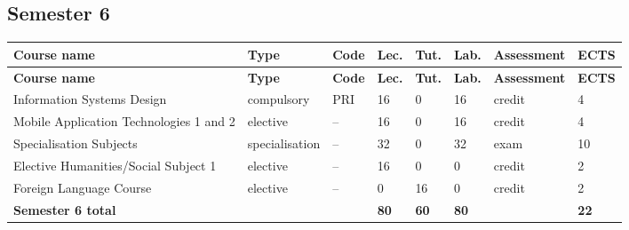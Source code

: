 \documentclass[12pt,a4paper]{article}
\newcommand{\thdrule}{\noalign{\global\setlength{\extrarowheight}{0pt}}}
\newcommand{\thdend}{\noalign{\global\setlength{\extrarowheight}{4pt}}}
\begin{document}
\subsection*{Semester 6}

{\scriptsize
\begin{longtable}{m{5.0cm}m{1.9cm}m{0.75cm}m{0.85cm}m{0.85cm}m{0.85cm}m{1.45cm}m{0.9cm}}
\thdrule\toprule
\rowcolor{pjatkRed}
{\color{white}\footnotesize\textbf{\vphantom{Ag}Course name}} & {\color{white}\footnotesize\textbf{\vphantom{Ag}Type}} & {\color{white}\footnotesize\textbf{\vphantom{Ag}Code}} & {\color{white}\footnotesize\textbf{\vphantom{Ag}Lec.}} & {\color{white}\footnotesize\textbf{\vphantom{Ag}Tut.}} & {\color{white}\footnotesize\textbf{\vphantom{Ag}Lab.}} & {\color{white}\footnotesize\textbf{\vphantom{Ag}Assessment}} & {\color{white}\footnotesize\textbf{\vphantom{Ag}ECTS}} \\
\midrule\thdend
\endfirsthead
\thdrule\toprule
\rowcolor{pjatkRed}
{\color{white}\footnotesize\textbf{\vphantom{Ag}Course name}} & {\color{white}\footnotesize\textbf{\vphantom{Ag}Type}} & {\color{white}\footnotesize\textbf{\vphantom{Ag}Code}} & {\color{white}\footnotesize\textbf{\vphantom{Ag}Lec.}} & {\color{white}\footnotesize\textbf{\vphantom{Ag}Tut.}} & {\color{white}\footnotesize\textbf{\vphantom{Ag}Lab.}} & {\color{white}\footnotesize\textbf{\vphantom{Ag}Assessment}} & {\color{white}\footnotesize\textbf{\vphantom{Ag}ECTS}} \\
\midrule\thdend
\endhead
\rowcolor{tableRowLight} Information Systems Design & {\scriptsize compulsory} & PRI & 16 & 0 & 16 & {\scriptsize credit} & 4 \\
\rowcolor{tableElective} Mobile Application Technologies 1 and 2 & {\scriptsize elective} & -- & 16 & 0 & 16 & {\scriptsize credit} & 4 \\
\rowcolor{tableElective} Specialisation Subjects & {\scriptsize specialisation} & -- & 32 & 0 & 32 & {\scriptsize exam} & 10 \\
\rowcolor{tableElective} Elective Humanities/Social Subject 1 & {\scriptsize elective} & -- & 16 & 0 & 0 & {\scriptsize credit} & 2 \\
\rowcolor{tableElective} Foreign Language Course & {\scriptsize elective} & -- & 0 & 16 & 0 & {\scriptsize credit} & 2 \\
\midrule[\heavyrulewidth]
\rowcolor{tableSummary} \textbf{Semester 6 total} & & & \textbf{80} & \textbf{60} & \textbf{80} & & \textbf{22} \\
\bottomrule
\end{longtable}}
\end{document}
